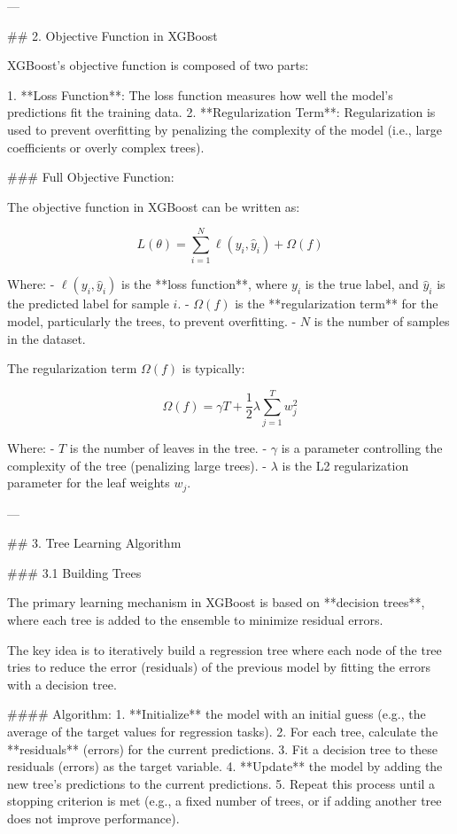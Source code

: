 ---

## 2. Objective Function in XGBoost

XGBoost's objective function is composed of two parts:

1. **Loss Function**: The loss function measures how well the model’s predictions fit the training data.
2. **Regularization Term**: Regularization is used to prevent overfitting by penalizing the complexity of the model (i.e., large coefficients or overly complex trees).

### Full Objective Function:

The objective function in XGBoost can be written as:

\[
L(\theta) = \sum_{i=1}^N \ell(y_i, \hat{y}_i) + \Omega(f)
\]

Where:
- \( \ell(y_i, \hat{y}_i) \) is the **loss function**, where \( y_i \) is the true label, and \( \hat{y}_i \) is the predicted label for sample \( i \).
- \( \Omega(f) \) is the **regularization term** for the model, particularly the trees, to prevent overfitting.
- \( N \) is the number of samples in the dataset.

The regularization term \( \Omega(f) \) is typically:

\[
\Omega(f) = \gamma T + \frac{1}{2} \lambda \sum_{j=1}^T w_j^2
\]

Where:
- \( T \) is the number of leaves in the tree.
- \( \gamma \) is a parameter controlling the complexity of the tree (penalizing large trees).
- \( \lambda \) is the L2 regularization parameter for the leaf weights \( w_j \).

---

## 3. Tree Learning Algorithm

### 3.1 Building Trees

The primary learning mechanism in XGBoost is based on **decision trees**, where each tree is added to the ensemble to minimize residual errors.

The key idea is to iteratively build a regression tree where each node of the tree tries to reduce the error (residuals) of the previous model by fitting the errors with a decision tree.

#### Algorithm:
1. **Initialize** the model with an initial guess (e.g., the average of the target values for regression tasks).
2. For each tree, calculate the **residuals** (errors) for the current predictions.
3. Fit a decision tree to these residuals (errors) as the target variable.
4. **Update** the model by adding the new tree’s predictions to the current predictions.
5. Repeat this process until a stopping criterion is met (e.g., a fixed number of trees, or if adding another tree does not improve performance).

